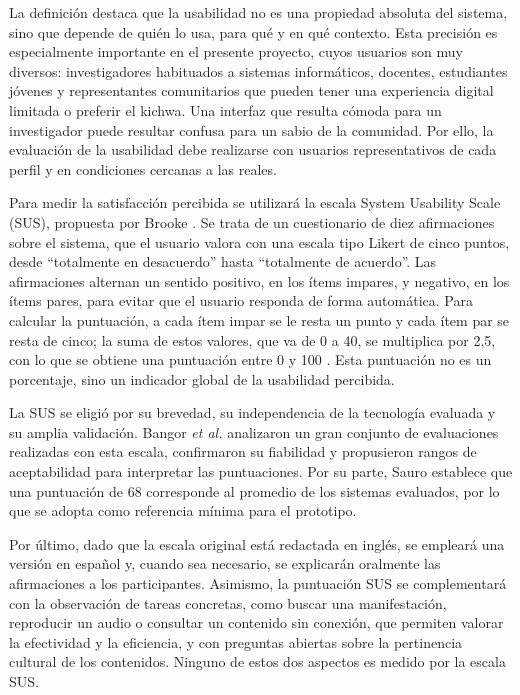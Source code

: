 La definición destaca que la usabilidad no es una propiedad absoluta del sistema, sino que depende de quién lo usa, para qué y en qué contexto. Esta precisión es especialmente importante en el presente proyecto, cuyos usuarios son muy diversos: investigadores habituados a sistemas informáticos, docentes, estudiantes jóvenes y representantes comunitarios que pueden tener una experiencia digital limitada o preferir el kichwa. Una interfaz que resulta cómoda para un investigador puede resultar confusa para un sabio de la comunidad. Por ello, la evaluación de la usabilidad debe realizarse con usuarios representativos de cada perfil y en condiciones cercanas a las reales.

Para medir la satisfacción percibida se utilizará la escala System Usability Scale (SUS), propuesta por Brooke \cite{brooke1996sus}. Se trata de un cuestionario de diez afirmaciones sobre el sistema, que el usuario valora con una escala tipo Likert de cinco puntos, desde ``totalmente en desacuerdo'' hasta ``totalmente de acuerdo''. Las afirmaciones alternan un sentido positivo, en los ítems impares, y negativo, en los ítems pares, para evitar que el usuario responda de forma automática. Para calcular la puntuación, a cada ítem impar se le resta un punto y cada ítem par se resta de cinco; la suma de estos valores, que va de 0 a 40, se multiplica por 2{,}5, con lo que se obtiene una puntuación entre 0 y 100 \cite{brooke1996sus}. Esta puntuación no es un porcentaje, sino un indicador global de la usabilidad percibida.

La SUS se eligió por su brevedad, su independencia de la tecnología evaluada y su amplia validación. Bangor \textit{et al.} \cite{bangor2008sus} analizaron un gran conjunto de evaluaciones realizadas con esta escala, confirmaron su fiabilidad y propusieron rangos de aceptabilidad para interpretar las puntuaciones. Por su parte, Sauro \cite{sauro2011sus} establece que una puntuación de 68 corresponde al promedio de los sistemas evaluados, por lo que se adopta como referencia mínima para el prototipo.

Por último, dado que la escala original está redactada en inglés, se empleará una versión en español y, cuando sea necesario, se explicarán oralmente las afirmaciones a los participantes. Asimismo, la puntuación SUS se complementará con la observación de tareas concretas, como buscar una manifestación, reproducir un audio o consultar un contenido sin conexión, que permiten valorar la efectividad y la eficiencia, y con preguntas abiertas sobre la pertinencia cultural de los contenidos. Ninguno de estos dos aspectos es medido por la escala SUS.
